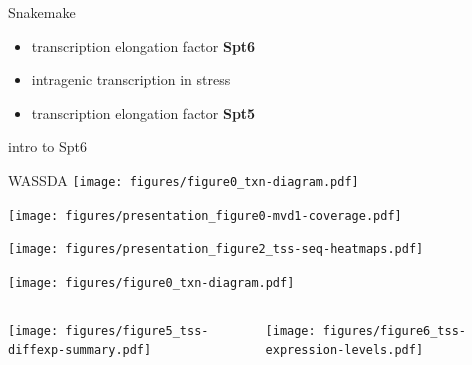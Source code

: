 \documentclass[aspectratio=169]{beamer}
\begin{document}
\begin{frame}{Snakemake}
\end{frame}

\begin{frame}
    \begin{itemize}[]
        \setlength{\itemsep}{1cm}
        \item transcription elongation factor \textbf{Spt6}
        \item intragenic transcription in stress
        \item transcription elongation factor \textbf{Spt5}
    \end{itemize}
\end{frame}

\begin{frame}{intro to Spt6}
\end{frame}

\begin{frame}{WASSDA}
\texttt{[image: figures/figure0\_txn-diagram.pdf]}
\end{frame}



\begin{frame}
\texttt{[image: figures/presentation\_figure0-mvd1-coverage.pdf]}
\end{frame}

\begin{frame}
\texttt{[image: figures/presentation\_figure2\_tss-seq-heatmaps.pdf]}
\end{frame}

\begin{frame}
    \centering
    \texttt{[image: figures/figure0\_txn-diagram.pdf]}
    \begin{columns}
        \begin{column}{0.5\textwidth}
            \centering
            \texttt{[image: figures/figure5\_tss-diffexp-summary.pdf]}
        \end{column}
        \begin{column}{0.5\textwidth}
            \centering
            \texttt{[image: figures/figure6\_tss-expression-levels.pdf]}
        \end{column}
    \end{columns}
\end{frame}
\end{document}
